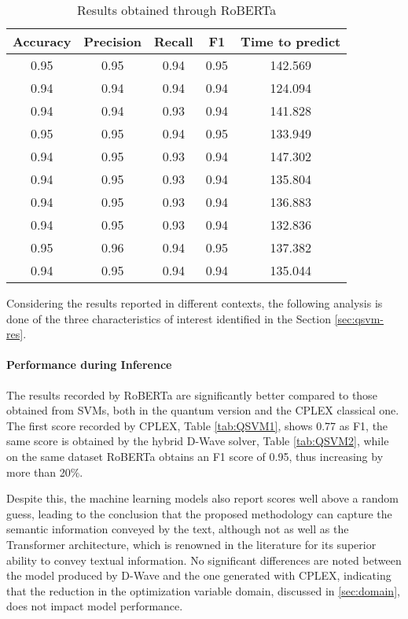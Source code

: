 \begin{table}[H]
    \centering
    \begin{tabular}{ccccc}
    \toprule
    Accuracy & Precision & Recall & F1    & Time to predict \\
    \midrule
    0.95     & 0.95      & 0.94   & 0.95  & 142.569         \\
    0.94     & 0.94      & 0.94   & 0.94  & 124.094         \\
    0.94     & 0.94      & 0.93   & 0.94  & 141.828         \\
    0.95     & 0.95      & 0.94   & 0.95  & 133.949         \\
    0.94     & 0.95      & 0.93   & 0.94  & 147.302         \\
    0.94     & 0.95      & 0.93   & 0.94  & 135.804         \\
    0.94     & 0.95      & 0.93   & 0.94  & 136.883         \\
    0.94     & 0.95      & 0.93   & 0.94  & 132.836         \\
    0.95     & 0.96      & 0.94   & 0.95  & 137.382         \\
    0.94     & 0.95      & 0.94   & 0.94  & 135.044         \\
    \bottomrule
    \end{tabular}
    \caption{Results obtained through RoBERTa}
    \label{tab:QSVM3}
\end{table}

Considering the results reported in different contexts, the following analysis is done of the three characteristics of interest identified in the Section \ref{sec:qsvm-res}.

\paragraph{Performance during Inference} The results recorded by RoBERTa are significantly better compared to those obtained from SVMs, both in the quantum version and the CPLEX classical one.
The first score recorded by CPLEX, Table \ref{tab:QSVM1}, shows 0.77 as F1, the same score is obtained by the hybrid D-Wave solver, Table \ref{tab:QSVM2}, while on the same dataset RoBERTa obtains an F1 score of 0.95, thus increasing by more than 20\%.

Despite this, the machine learning models also report scores well above a random guess, leading to the conclusion that the proposed methodology can capture the semantic information conveyed by the text, although not as well as the Transformer architecture, which is renowned in the literature for its superior ability to convey textual information. No significant differences are noted between the model produced by D-Wave and the one generated with CPLEX, indicating that the reduction in the optimization variable domain, discussed in \ref{sec:domain}, does not impact model performance.

